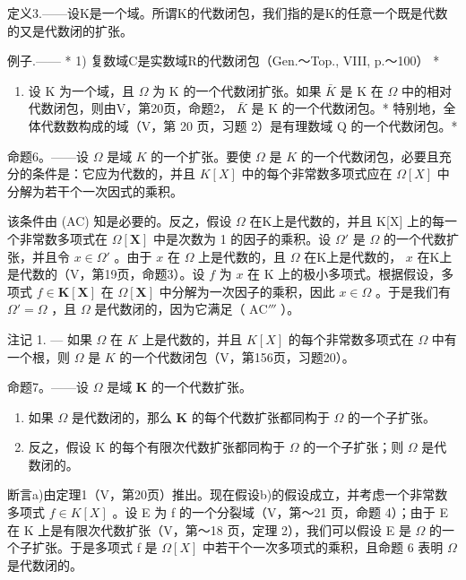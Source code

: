 定义3.——设K是一个域。所谓K的代数闭包，我们指的是K的任意一个既是代数的又是代数闭的扩张。

例子.—— * 1) 复数域C是实数域R的代数闭包（Gen.～Top., VIII, p.～100） *

\begin{enumerate}
\def\labelenumi{\arabic{enumi})}
\setcounter{enumi}{1}
\tightlist
\item
  设 K 为一个域，且 \(\Omega\) 为 K 的一个代数闭扩张。如果 \(\bar{K}\) 是 K 在 \(\Omega\) 中的相对代数闭包，则由V，第20页，命题2， \(\bar{K}\) 是 K 的一个代数闭包。* 特别地，全体代数数构成的域（V，第 20 页，习题 2）是有理数域 Q 的一个代数闭包。*
\end{enumerate}

命题6。——设 \(\Omega\) 是域 \(K\) 的一个扩张。要使 \(\Omega\) 是 \(K\) 的一个代数闭包，必要且充分的条件是：它应为代数的，并且 \(K[X]\) 中的每个非常数多项式应在 \(\Omega[X]\) 中分解为若干个一次因式的乘积。

该条件由 (AC) 知是必要的。反之，假设 \(\Omega\) 在K上是代数的，并且 K{[}X{]} 上的每一个非常数多项式在 \(\Omega[\mathbf{X}]\) 中是次数为 1 的因子的乘积。设 \(\Omega'\) 是 \(\Omega\) 的一个代数扩张，并且令 \(x \in \Omega'\) 。由于 \(x\) 在 \(\Omega\) 上是代数的，且 \(\Omega\) 在K上是代数的， \(x\) 在K上是代数的（V，第19页，命题3）。设 \(f\) 为 \(x\) 在 K 上的极小多项式。根据假设，多项式 \(f \in \mathbf{K}[\mathbf{X}]\) 在 \(\Omega[\mathbf{X}]\) 中分解为一次因子的乘积，因此 \(x \in \Omega\) 。于是我们有 \(\Omega' = \Omega\) ，且 \(\Omega\) 是代数闭的，因为它满足（ \(\mathrm{AC}'''\) ）。

注记 1. --- 如果 \(\Omega\) 在 \(K\) 上是代数的，并且 \(K[X]\) 的每个非常数多项式在 \(\Omega\) 中有一个根，则 \(\Omega\) 是 \(K\) 的一个代数闭包（V，第156页，习题20）。

命题7。——设 \(\Omega\) 是域 \(\mathbf{K}\) 的一个代数扩张。

\begin{enumerate}
\def\labelenumi{\alph{enumi})}
\item
  如果 \(\Omega\) 是代数闭的，那么 \(\mathbf{K}\) 的每个代数扩张都同构于 \(\Omega\) 的一个子扩张。
\item
  反之，假设 K 的每个有限次代数扩张都同构于 \(\Omega\) 的一个子扩张；则 \(\Omega\) 是代数闭的。
\end{enumerate}

断言a)由定理1（V，第20页）推出。现在假设b)的假设成立，并考虑一个非常数多项式 \(f \in K[X]\) 。设 E 为 f 的一个分裂域（V，第～21 页，命题 4）；由于 E 在 K 上是有限次代数扩张（V，第～18 页，定理 2），我们可以假设 E 是 \(\Omega\) 的一个子扩张。于是多项式 f 是 \(\Omega[X]\) 中若干个一次多项式的乘积，且命题 6 表明 \(\Omega\) 是代数闭的。

